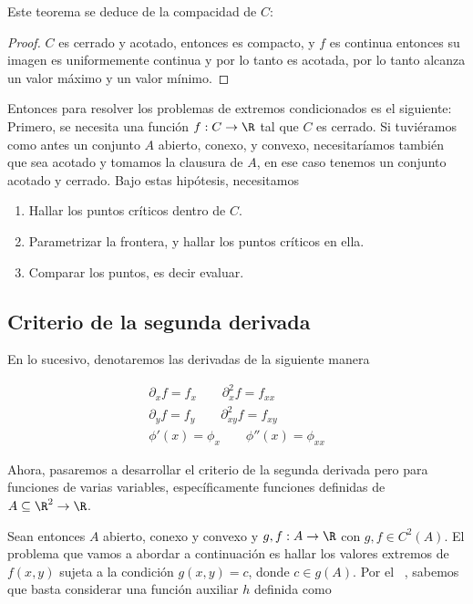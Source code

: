 Este teorema se deduce de la compacidad de $C$:

\begin{proof}
    $C$ es cerrado y acotado, entonces es compacto, y $f$ es continua entonces su imagen es uniformemente continua y por lo tanto es acotada, por lo tanto alcanza un valor máximo y un valor mínimo.
\end{proof}

Entonces para resolver los problemas de extremos condicionados es el siguiente: Primero, se necesita una función $f: C \rightarrow \R$ tal que $C$ es cerrado. Si tuviéramos como antes un conjunto $A$ abierto, conexo, y convexo, necesitaríamos también que sea acotado y tomamos la clausura de $A$, en ese caso tenemos un conjunto acotado y cerrado. Bajo estas hipótesis, necesitamos

\begin{enumerate}
    \item Hallar los puntos críticos dentro de $C$.
    \item Parametrizar la frontera, y hallar los puntos críticos en ella.
    \item Comparar los puntos, es decir evaluar.
\end{enumerate}

\subsection{Criterio de la segunda derivada}

\begin{nota}
    En lo sucesivo, denotaremos las derivadas de la siguiente manera
    
    \begin{gather*}
        \partial_xf = f_x \qquad \partial_x^2f = f_{xx} \\
        \partial_yf = f_y \qquad \partial_{xy}^2f = f_{xy} \\
        \phi'(x) = \phi_x \qquad \phi''(x) = \phi_{xx}
    \end{gather*}
\end{nota}

Ahora, pasaremos a desarrollar el criterio de la segunda derivada pero para funciones de varias variables, específicamente funciones definidas de $A \subseteq \R^2 \rightarrow \R$.

Sean entonces $A$ abierto, conexo y convexo y $g,f: A \rightarrow \R$ con $g,f \in C^2(A)$. El problema que vamos a abordar a continuación es hallar los valores extremos de $f(x,y)$ sujeta a la condición $g(x,y) = c$, donde $c \in g(A)$. Por el \Lagrange~, sabemos que basta considerar una función auxiliar $h$ definida como

